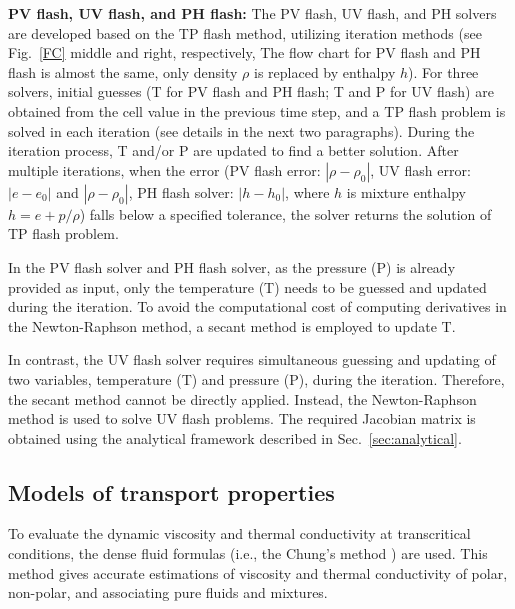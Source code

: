 \textbf{PV flash, UV flash, and PH flash:}
The PV flash, UV flash, and PH solvers are developed based on the TP flash method, utilizing iteration methods (see Fig.~\ref{FC} middle and right, respectively, The flow chart for PV flash and PH flash is almost the same, only density $\rho$ is replaced by enthalpy $h$). For three solvers, initial guesses (T for PV flash and PH flash; T and P for UV flash) are obtained from the cell value in the previous time step, and a TP flash problem is solved in each iteration (see details in the next two paragraphs). During the iteration process, T and/or P are updated to find a better solution. After multiple iterations, when the error (PV flash error: $|\rho - \rho_0|$, UV flash error: $|e - e_0|$ and $|\rho - \rho_0|$, PH flash solver: $|h - h_0|$, where $h$ is mixture enthalpy $h=e+p/\rho$) falls below a specified tolerance, the solver returns the solution of TP flash problem.


In the PV flash solver and PH flash solver, as the pressure (P) is already provided as input, only the temperature (T) needs to be guessed and updated during the iteration. To avoid the computational cost of computing derivatives in the Newton-Raphson method, a secant method is employed to update T.


In contrast, the UV flash solver requires simultaneous guessing and updating of two variables,  temperature (T) and pressure (P), during the iteration. Therefore, the secant method cannot be directly applied. Instead, the Newton-Raphson method is used to solve UV flash problems. The required Jacobian matrix is obtained using the analytical framework described in Sec.~\ref{sec:analytical}.



\subsection{Models of transport properties}
To evaluate the dynamic viscosity and thermal conductivity at transcritical conditions, the dense fluid formulas (i.e., the Chung's method \cite{chung1988generalized}) are used. This method gives accurate estimations of viscosity and thermal conductivity of polar, non-polar, and associating pure fluids and mixtures. 
